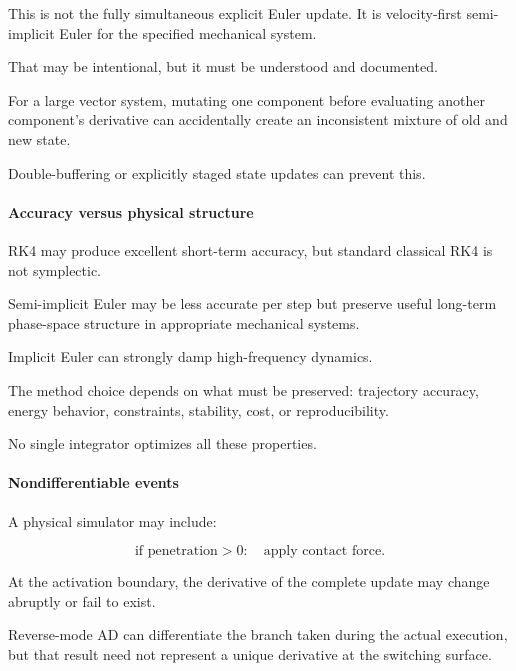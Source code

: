 This is not the fully simultaneous explicit Euler update. It is velocity-first semi-implicit Euler for the specified mechanical system.

That may be intentional, but it must be understood and documented.

For a large vector system, mutating one component before evaluating another component's derivative can accidentally create an inconsistent mixture of old and new state.

Double-buffering or explicitly staged state updates can prevent this.

\paragraph{Accuracy versus physical structure}\label{02-foundations-ii-ch022-accuracy-versus-physical-structure}

\hypertarget{02-foundations-ii-ch022-accuracy-versus-physical-structure}{}

RK4 may produce excellent short-term accuracy, but standard classical RK4 is not symplectic.

Semi-implicit Euler may be less accurate per step but preserve useful long-term phase-space structure in appropriate mechanical systems.

Implicit Euler can strongly damp high-frequency dynamics.

The method choice depends on what must be preserved: trajectory accuracy, energy behavior, constraints, stability, cost, or reproducibility.

No single integrator optimizes all these properties.

\paragraph{Nondifferentiable events}\label{02-foundations-ii-ch022-nondifferentiable-events}

\hypertarget{02-foundations-ii-ch022-nondifferentiable-events}{}

A physical simulator may include:

\[
\text{if penetration}>0: \quad\text{apply contact force}.
\]

At the activation boundary, the derivative of the complete update may change abruptly or fail to exist.

Reverse-mode AD can differentiate the branch taken during the actual execution, but that result need not represent a unique derivative at the switching surface.

